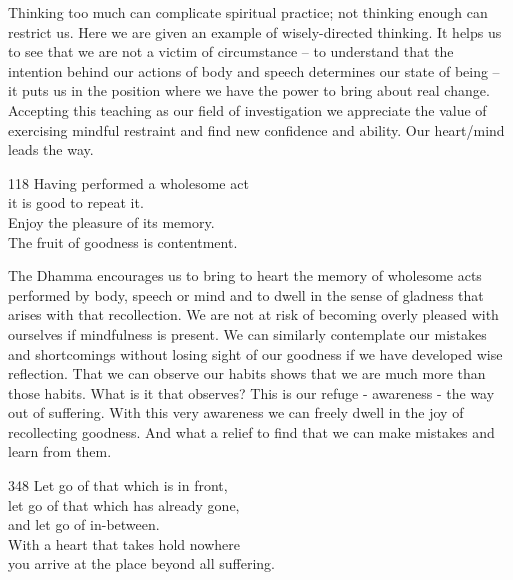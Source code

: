 \begin{dhpRefl}

Thinking too much can complicate spiritual practice; not thinking
enough can restrict us. Here we are given an example of
wisely-directed thinking. It helps us to see that we are not a victim
of circumstance -- to understand that the intention behind our
actions of body and speech determines our state of being -- it puts
us in the position where we have the power to bring about real
change. Accepting this teaching as our field of investigation we
appreciate the value of exercising mindful restraint and find new
confidence and ability. Our heart/mind leads the way.

\end{dhpRefl}


\begin{dhpVerse}{118}
\label{dhp-118}
Having performed a wholesome act\\
it is good to repeat it.\\
Enjoy the pleasure of its memory.\\
The fruit of goodness is contentment.
\end{dhpVerse}

\begin{dhpRefl}

The Dhamma encourages us to bring to heart the memory of wholesome
acts performed by body, speech or mind and to dwell in the sense of
gladness that arises with that recollection. We are not at risk of
becoming overly pleased with ourselves if mindfulness is present. We
can similarly contemplate our mistakes and shortcomings without
losing sight of our goodness if we have developed wise reflection.
That we can observe our habits shows that we are much more than those
habits. What is it that observes? This is our refuge - awareness -
the way out of suffering. With this very awareness we can freely
dwell in the joy of recollecting goodness. And what a relief to find
that we can make mistakes and learn from them.

\end{dhpRefl}



\begin{dhpVerse}{348}
\label{dhp-348}
Let go of that which is in front,\\
let go of that which has already gone,\\
and let go of in-between.\\
With a heart that takes hold nowhere\\
you arrive at the place beyond all suffering.
\end{dhpVerse}

